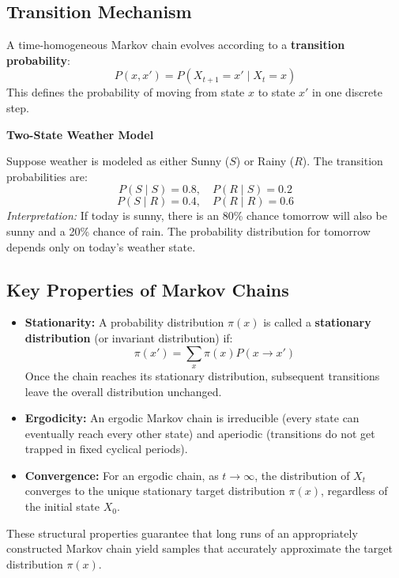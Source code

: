 \documentclass[12pt,a4paper]{article}
\begin{document}
\subsection{Transition Mechanism}

A time-homogeneous Markov chain evolves according to a \textbf{transition probability}:
\[
P(x, x') = P(X_{t+1} = x' \mid X_t = x)
\]
This defines the probability of moving from state $x$ to state $x'$ in one discrete step.

\begin{example}
\textbf{Two-State Weather Model}

Suppose weather is modeled as either Sunny ($S$) or Rainy ($R$). The transition probabilities are:
\[
P(S \mid S) = 0.8, \quad P(R \mid S) = 0.2
\]
\[
P(S \mid R) = 0.4, \quad P(R \mid R) = 0.6
\]
\textit{Interpretation:} If today is sunny, there is an 80\% chance tomorrow will also be sunny and a 20\% chance of rain. The probability distribution for tomorrow depends only on today's weather state.
\end{example}

\subsection{Key Properties of Markov Chains}

\begin{itemize}[leftmargin=1.5em]
    \item \textbf{Stationarity:} A probability distribution $\pi(x)$ is called a \textbf{stationary distribution} (or invariant distribution) if:
    \[
    \pi(x') = \sum_{x} \pi(x) P(x \to x')
    \]
    Once the chain reaches its stationary distribution, subsequent transitions leave the overall distribution unchanged.
    
    \item \textbf{Ergodicity:} An ergodic Markov chain is irreducible (every state can eventually reach every other state) and aperiodic (transitions do not get trapped in fixed cyclical periods).
    
    \item \textbf{Convergence:} For an ergodic chain, as $t \to \infty$, the distribution of $X_t$ converges to the unique stationary target distribution $\pi(x)$, regardless of the initial state $X_0$.
\end{itemize}

\begin{keyidea}
These structural properties guarantee that long runs of an appropriately constructed Markov chain yield samples that accurately approximate the target distribution $\pi(x)$.
\end{keyidea}
\end{document}
